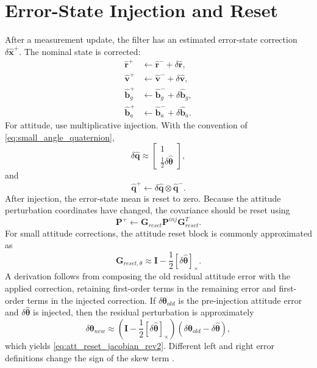 \documentclass[11pt,oneside]{book}
\renewcommand{\skew}[1]{\left[#1\right]_{\times}}
\newcommand{\quat}{\mathbf{q}}
\newcommand{\xb}{\mathbf{x}}
\newcommand{\vb}{\mathbf{v}}
\newcommand{\rb}{\mathbf{r}}
\newcommand{\bb}{\mathbf{b}}
\newcommand{\I}{\mathbf{I}}
\begin{document}
\section{Error-State Injection and Reset}
After a measurement update, the filter has an estimated error-state correction $\delta\hat{\xb}^+$. The nominal state is corrected:
\begin{align}
\hat{\rb}^+ &\leftarrow \hat{\rb}^-+\delta\hat{\rb},\\
\hat{\vb}^+ &\leftarrow \hat{\vb}^-+\delta\hat{\vb},\\
\hat{\bb}_g^+ &\leftarrow \hat{\bb}_g^-+\delta\hat{\bb}_g,\\
\hat{\bb}_a^+ &\leftarrow \hat{\bb}_a^-+\delta\hat{\bb}_a.
\end{align}
For attitude, use multiplicative injection. With the convention of \cref{eq:small_angle_quaternion},
\begin{equation}
\delta\hat{\quat}\approx\begin{bmatrix}1\\\frac{1}{2}\delta\hat{\boldsymbol\theta}\end{bmatrix},
\end{equation}
and
\begin{equation}
\hat{\quat}^+\leftarrow\delta\hat{\quat}\otimes\hat{\quat}^-.
\end{equation}
After injection, the error-state mean is reset to zero. Because the attitude perturbation coordinates have changed, the covariance should be reset using
\begin{equation}
\mathbf{P}^+\leftarrow\mathbf{G}_{reset}\mathbf{P}^{inj}\mathbf{G}_{reset}^T.
\end{equation}
For small attitude corrections, the attitude reset block is commonly approximated as
\begin{equation}
\mathbf{G}_{reset,\theta}\approx \I-\frac{1}{2}\skew{\delta\hat{\boldsymbol\theta}}.
\label{eq:att_reset_jacobian_rev2}
\end{equation}
A derivation follows from composing the old residual attitude error with the applied correction, retaining first-order terms in the remaining error and first-order terms in the injected correction. If $\delta\boldsymbol\theta_{old}$ is the pre-injection attitude error and $\delta\hat{\boldsymbol\theta}$ is injected, then the residual perturbation is approximately
\begin{equation}
\delta\boldsymbol\theta_{new}\approx\left(\I-\frac{1}{2}\skew{\delta\hat{\boldsymbol\theta}}\right)\left(\delta\boldsymbol\theta_{old}-\delta\hat{\boldsymbol\theta}\right),
\end{equation}
which yields \cref{eq:att_reset_jacobian_rev2}. Different left and right error definitions change the sign of the skew term \cite{sola2018}.
\end{document}
